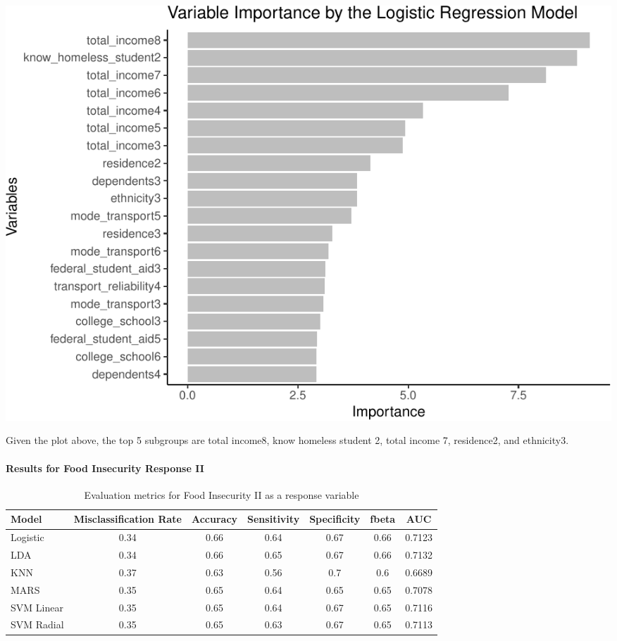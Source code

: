 \documentclass[
  10pt,
]{article}
\begin{document}
\begin{center}\includegraphics{phase2_report_files/figure-latex/unnamed-chunk-20-1} \end{center}

\hfill\break
Given the plot above, the top 5 subgroups are total income8, know homeless student 2, total income 7, residence2, and ethnicity3.\\

\hypertarget{results-for-food-insecurity-response-ii}{%
\paragraph{Results for Food Insecurity Response II}\label{results-for-food-insecurity-response-ii}}

\newline

\begin{table}[H]

\caption{\label{tab:unnamed-chunk-21}Evaluation metrics for Food Insecurity II  as a response variable}
\centering
\fontsize{12}{14}\selectfont
\begin{tabular}[t]{lcccccc}
\toprule
Model & Misclassification Rate & Accuracy & Sensitivity & Specificity & fbeta & AUC\\
\midrule
Logistic & 0.34 & 0.66 & 0.64 & 0.67 & 0.66 & 0.7123\\
LDA & 0.34 & 0.66 & 0.65 & 0.67 & 0.66 & 0.7132\\
KNN & 0.37 & 0.63 & 0.56 & 0.7 & 0.6 & 0.6689\\
MARS & 0.35 & 0.65 & 0.64 & 0.65 & 0.65 & 0.7078\\
SVM Linear & 0.35 & 0.65 & 0.64 & 0.67 & 0.65 & 0.7116\\
SVM Radial & 0.35 & 0.65 & 0.63 & 0.67 & 0.65 & 0.7113\\
\bottomrule
\end{tabular}
\end{table}
\end{document}
